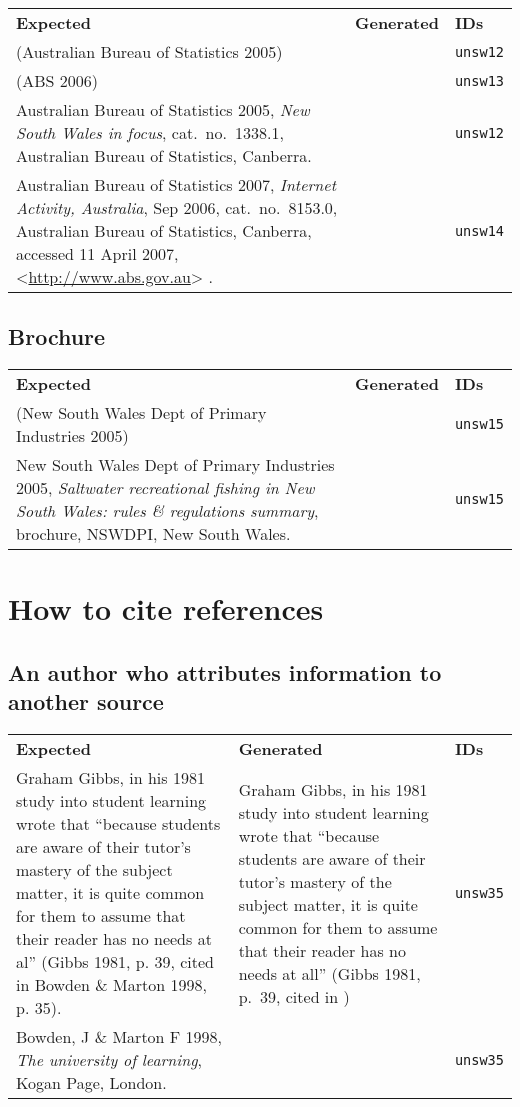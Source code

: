 \documentclass[a4paper,landscape,12pt]{article}
\newlength\q
\newlength\qr
\newenvironment{citetable}
  {\noindent\begin{longtable}{p{\q} p{\q} p{\qr}}\textbf{Expected} & \textbf{Generated} & \textbf{IDs}\\}
  {\end{longtable}}
\newcommand{\majorissue}[1]{\textcolor{red}{#1}}
\newcommand{\citeurlex}[1]{%
  \let\oldurlfont\UrlFont%
  \def\UrlFont{}%
  \textless\url{#1}\textgreater%
  \let\UrlFont\oldurlfont}
\begin{document}
\begin{citetable}
	(Australian Bureau of Statistics 2005) & \majorissue{\parencite{unsw12}} & \texttt{unsw12} \\
	(ABS 2006) & \parencite{unsw13} & \texttt{unsw13} \\
	Australian Bureau of Statistics 2005, \textit{New South Wales in focus}, cat.~no.~1338.1, Australian Bureau of Statistics, Canberra. & \fullcite{unsw12} & \texttt{unsw12} \\
	Australian Bureau of Statistics 2007, \textit{Internet Activity, Australia}, Sep 2006, cat.~no.~8153.0, Australian Bureau of Statistics, Canberra, accessed 11 April 2007, \citeurlex{http://www.abs.gov.au}. & \fullcite{unsw14} & \texttt{unsw14} \\
\end{citetable}

\subsection{Brochure}

\begin{citetable}
	(New South Wales Dept of Primary Industries 2005) & \parencite{unsw15} & \texttt{unsw15} \\
	New South Wales Dept of Primary Industries 2005, \textit{Saltwater recreational fishing in New South Wales: rules \& regulations summary}, brochure, NSWDPI, New South Wales. & \fullcite{unsw15} & \texttt{unsw15} \\
\end{citetable}

\section{How to cite references}

\subsection{An author who attributes information to another source}

\begin{citetable}
	Graham Gibbs, in his 1981 study into student learning wrote that ``because students are aware of their tutor's mastery of the subject matter, it is quite common for them to assume that their reader has no needs at al'' (Gibbs 1981, p. 39, cited in Bowden \& Marton 1998, p. 35). & Graham Gibbs, in his 1981 study into student learning wrote that ``because students are aware of their tutor's mastery of the subject matter, it is quite common for them to assume that their reader has no needs at all'' \mkbibparens{Gibbs 1981, p.~39, cited in \cite[p.~35]{unsw35}} & \texttt{unsw35} \\
	Bowden, J \& Marton F 1998, \textit{The university of learning}, Kogan Page, London. & \fullcite{unsw35} & \texttt{unsw35} \\
\end{citetable}
\end{document}
